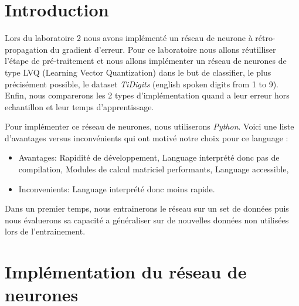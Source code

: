 \documentclass[11pt]{article}
\begin{document}
\EtsPageGenerate
\tableofcontents

\newpage
\section{Introduction}
Lors du laboratoire 2 nous avons impl\'ement\'e un r\'eseau de neurone \`a
r\'etro-propagation du gradient d’erreur. Pour ce laboratoire nous allons
r\'eutilliser l'étape de pré-traitement et nous allons implémenter un r\'eseau
de neurones de type LVQ (Learning Vector Quantization) dans le but de
classifier, le plus précisément possible, le dataset {\em TiDigits} (english
spoken digits from 1 to 9). Enfin, nous comparerons les 2 types
d'impl\'ementation quand a leur erreur hors echantillon et leur temps
d'apprentissage.

Pour implémenter ce r\'eseau de neurones, nous utiliserons {\em Python}.
Voici une liste d'avantages versus inconv\'enients qui ont motiv\'e notre choix
pour ce language :
\begin{itemize}
	\item Avantages:
		\subitem Rapidit\'e de d\'eveloppement,
		\subitem Language interpr\'et\'e donc pas de compilation,
		\subitem Modules de calcul matriciel performants,
		\subitem Language accessible,
	\item Inconvenients:
		\subitem Language interpr\'et\'e donc moins rapide. \\
\end{itemize}

Dans un premier temps, nous entrainerons le r\'eseau sur un set de donn\'ees puis
nous \'evaluerons sa capacit\'e a g\'en\'eraliser sur de nouvelles donn\'ees
non utilis\'ees lors de l'entrainement.

\section{Impl\'ementation du r\'eseau de neurones}
\end{document}
